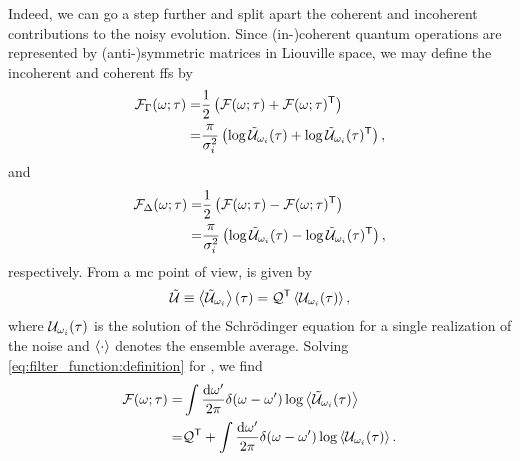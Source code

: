 Indeed, we can go a step further and split apart the coherent and incoherent contributions to the noisy evolution.
Since (in-)coherent quantum operations are represented by (anti-)symmetric matrices in Liouville space, we may define the incoherent and coherent \glspl{ff} by
\begin{equation}
    \label{eq:filter_function:incoherent}
    \begin{split}
        \mathcal{F}_\Gamma(\omega;\tau) =& \frac{1}{2}\left(\mathcal{F}(\omega;\tau) + \mathcal{F}(\omega;\tau)^\mathsf{T}\right) \\
                                   =& \frac{\pi}{\sigma_i^2}\left(\log\mathcal{\tilde{U}}_{\omega_i}(\tau) + \log\mathcal{\tilde{U}}_{\omega_i}(\tau)^\mathsf{T}\right),
    \end{split}
\end{equation}
and
\begin{equation}
    \label{eq:filter_function:coherent}
    \begin{split}
        \mathcal{F}_\Delta(\omega;\tau) =& \frac{1}{2}\left(\mathcal{F}(\omega;\tau) - \mathcal{F}(\omega;\tau)^\mathsf{T}\right) \\
                                   =& \frac{\pi}{\sigma_i^2}\left(\log\mathcal{\tilde{U}}_{\omega_i}(\tau) - \log\mathcal{\tilde{U}}_{\omega_i}(\tau)^\mathsf{T}\right),
    \end{split}
\end{equation}
respectively.
From a \gls{mc} point of view, \liouvUe is given by
\begin{align}
    \liouvUe \equiv \expval{\liouvUe_{\omega_i}}(\tau) = \liouvQ\transpose \expval{\liouvU_{\omega_i}(\tau)},
\end{align}
where $\mathcal{U}_{\omega_i}(\tau)$ is the solution of the Schrödinger equation for a single realization of the noise and $\expval{\cdot}$ denotes the ensemble average.
Solving \cref{eq:filter_function:definition} for \FF, we find
\begin{equation}
    \begin{split}
        \FF =& \int\frac{\dd{\omega'}}{2\pi} \delta(\omega-\omega') \log\expval{\liouvUe_{\omega_i}(\tau)} \\
            =& \liouvQ\transpose + \int\frac{\dd{\omega'}}{2\pi} \delta(\omega-\omega') \log\expval{\liouvU_{\omega_i}(\tau)}.
    \end{split}
\end{equation}
